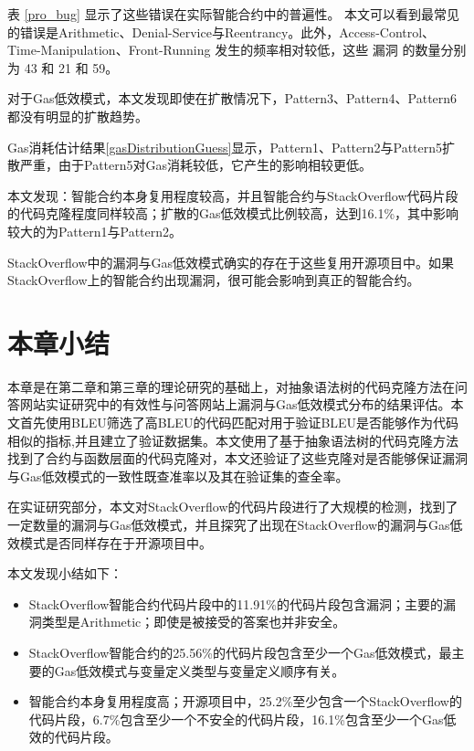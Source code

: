 表 \ref{pro_bug} 显示了这些错误在实际智能合约中的普遍性。
本文可以看到最常见的错误是Arithmetic、Denial-Service与Reentrancy。此外，Access-Control、Time-Manipulation、Front-Running 发生的频率相对较低，这些 漏洞 的数量分别为 43 和 21 和 59。

对于Gas低效模式，本文发现即使在扩散情况下，Pattern3、Pattern4、Pattern6都没有明显的扩散趋势。

Gas消耗估计结果\ref{gasDistributionGuess}显示，Pattern1、Pattern2与Pattern5扩散严重，由于Pattern5对Gas消耗较低，它产生的影响相较更低。

本文发现：智能合约本身复用程度较高，并且智能合约与StackOverflow代码片段的代码克隆程度同样较高；扩散的Gas低效模式比例较高，达到16.1\%，其中影响较大的为Pattern1与Pattern2。

StackOverflow中的漏洞与Gas低效模式确实的存在于这些复用开源项目中。如果 StackOverflow上的智能合约出现漏洞，很可能会影响到真正的智能合约。

\section{本章小结}

本章是在第二章和第三章的理论研究的基础上，对抽象语法树的代码克隆方法在问答网站实证研究中的有效性与问答网站上漏洞与Gas低效模式分布的结果评估。本文首先使用BLEU筛选了高BLEU的代码匹配对用于验证BLEU是否能够作为代码相似的指标,并且建立了验证数据集。本文使用了基于抽象语法树的代码克隆方法找到了合约与函数层面的代码克隆对，本文还验证了这些克隆对是否能够保证漏洞与Gas低效模式的一致性既查准率以及其在验证集的查全率。

在实证研究部分，本文对StackOverflow的代码片段进行了大规模的检测，找到了一定数量的漏洞与Gas低效模式，并且探究了出现在StackOverflow的漏洞与Gas低效模式是否同样存在于开源项目中。

本文发现小结如下：
\begin{itemize}
    \item StackOverflow智能合约代码片段中的11.91\%的代码片段包含漏洞；主要的漏洞类型是Arithmetic；即使是被接受的答案也并非安全。
    \item StackOverflow智能合约的25.56\%的代码片段包含至少一个Gas低效模式，最主要的Gas低效模式与变量定义类型与变量定义顺序有关。
    \item 智能合约本身复用程度高；开源项目中，25.2\%至少包含一个StackOverflow的代码片段，6.7\%包含至少一个不安全的代码片段，16.1\%包含至少一个Gas低效的代码片段。
\end{itemize}
